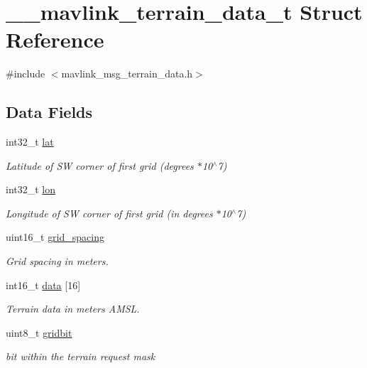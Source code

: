 \hypertarget{struct____mavlink__terrain__data__t}{\section{\+\_\+\+\_\+mavlink\+\_\+terrain\+\_\+data\+\_\+t Struct Reference}
\label{struct____mavlink__terrain__data__t}
}


{\ttfamily \#include $<$mavlink\+\_\+msg\+\_\+terrain\+\_\+data.\+h$>$}

\subsection*{Data Fields}
\begin{DoxyCompactItemize}
\item 
int32\+\_\+t \hyperlink{struct____mavlink__terrain__data__t_a5ba602eaa2166b88b73d0107f8d6e5d5}{lat}
\begin{DoxyCompactList}\small\item\em Latitude of S\+W corner of first grid (degrees $\ast$10$^\wedge$7) \end{DoxyCompactList}\item 
int32\+\_\+t \hyperlink{struct____mavlink__terrain__data__t_afd1029770f4bf58ac24f239ad0b2d314}{lon}
\begin{DoxyCompactList}\small\item\em Longitude of S\+W corner of first grid (in degrees $\ast$10$^\wedge$7) \end{DoxyCompactList}\item 
uint16\+\_\+t \hyperlink{struct____mavlink__terrain__data__t_a4aecaef23ec7f19bc3bf773c4858d758}{grid\+\_\+spacing}
\begin{DoxyCompactList}\small\item\em Grid spacing in meters. \end{DoxyCompactList}\item 
int16\+\_\+t \hyperlink{struct____mavlink__terrain__data__t_a45c3b14fcfab857128e407c4beb43666}{data} \mbox{[}16\mbox{]}
\begin{DoxyCompactList}\small\item\em Terrain data in meters A\+M\+S\+L. \end{DoxyCompactList}\item 
uint8\+\_\+t \hyperlink{struct____mavlink__terrain__data__t_ab7f84393c0e101ca9e90e347caba9006}{gridbit}
\begin{DoxyCompactList}\small\item\em bit within the terrain request mask \end{DoxyCompactList}\end{DoxyCompactItemize}


